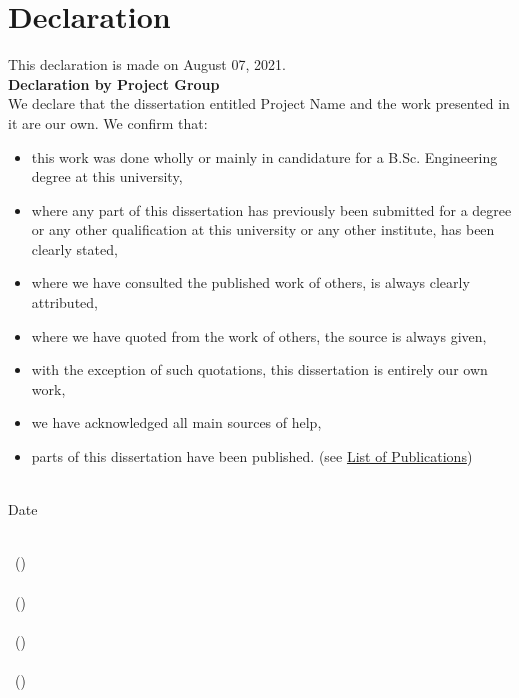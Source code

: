 \chapter*{Declaration}


\begin{flushleft}
	This declaration is made on August 07, 2021. \\
	\vspace{10mm}
	\textbf{Declaration by Project Group} \\
	We declare that the dissertation entitled Project Name and the work presented in it are our own. We confirm that:
	
	\begin{itemize}[noitemsep,topsep=0pt]
		\item this work was done wholly or mainly in candidature for a B.Sc. Engineering degree at this university,
		\item where any part of this dissertation has previously been submitted for a degree or any other qualification at this university or any other institute, has been clearly stated,
		\item where we have consulted the published work of others, is always clearly attributed,
		\item where we have quoted from the work of others, the source is always given,
		\item with the exception of such quotations, this dissertation is entirely our own work,
		\item we have acknowledged all main sources of help,
		\item parts of this dissertation have been published. (see \hyperref[chapter:appendix3]{List of Publications})
	\end{itemize}

\vspace{15mm}
\begin{multicols}{2}
	{\makebox[3cm]{\dotfill}} \\ 
	Date
	\vfill\null
	\columnbreak
	
	{\makebox[7cm]{\dotfill}} \\ 
	\memberA \  (\indexA)  \\
	\vspace{12mm}
	{\makebox[7cm]{\dotfill}} \\ 
	\memberB \ (\indexB)  \\
	\vspace{12mm}
	{\makebox[7cm]{\dotfill}} \\ 
	\memberC \ (\indexC)  \\
	\vspace{12mm}
	{\makebox[7cm]{\dotfill}} \\ 
	\memberD \ (\indexD)  \\

\end{multicols}


\end{flushleft}
